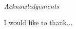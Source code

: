 \thispagestyle{plain}
\begin{center}
	\LARGE{\emph{Acknowledgements}}
\end{center}
\vspace{1cm}
I would like to thank...
